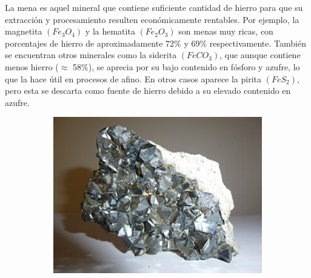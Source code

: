 \documentclass[12pt,a4paper]{article}
\begin{document}
La mena es aquel mineral que contiene suficiente cantidad de hierro para que su extracción y procesamiento resulten económicamente rentables. Por ejemplo, la magnetita $(Fe_3O_4)$ y la hematita $(Fe_2O_3)$ son menas muy ricas, con porcentajes de hierro de aproximadamente 72\% y 69\% respectivamente. También se encuentran otros minerales como la siderita $(FeCO_3)$, que aunque contiene menos hierro ($\approx$ 58\%), se aprecia por su bajo contenido en fósforo y azufre, lo que la hace útil en procesos de afino. En otros casos aparece la pirita $(FeS_2)$, pero esta se descarta como fuente de hierro debido a su elevado contenido en azufre.

\begin{figure}[h!]
    \centering
    \begin{subfigure}{0.45\textwidth}
        \centering
        \includegraphics[width=\textwidth]{Inagenes para latex/magnetita.png}
        \label{magnetita}


\end{subfigure}
\end{figure}
\end{document}
